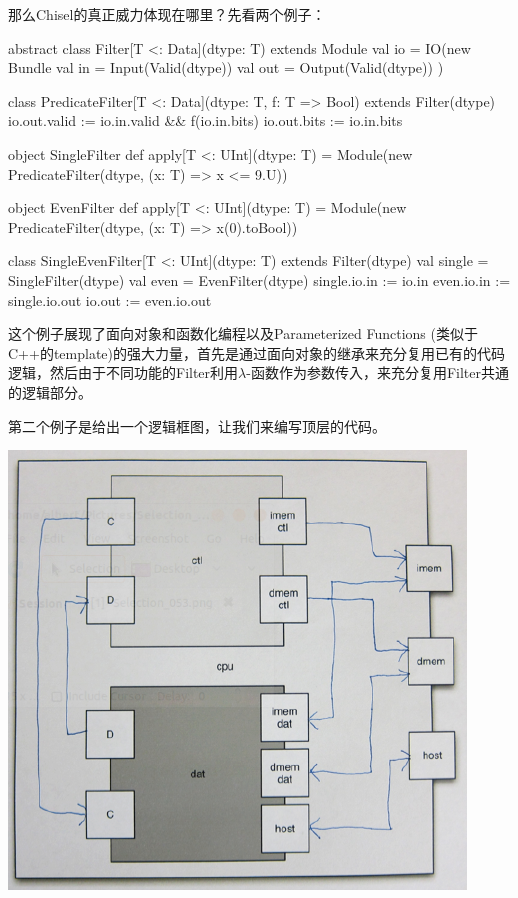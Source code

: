 \documentclass{article}
\begin{document}
	那么Chisel的真正威力体现在哪里？先看两个例子：
	\begin{multicols}{2}
	\begin{scala}
	abstract class Filter[T <: Data](dtype: T) extends Module {
		val io = IO(new Bundle {
			val in = Input(Valid(dtype))
			val out = Output(Valid(dtype))
		})
	}
	
	class PredicateFilter[T <: Data](dtype: T, f: T => Bool) extends Filter(dtype) {
		io.out.valid := io.in.valid && f(io.in.bits)
		io.out.bits  := io.in.bits
	}
	
	object SingleFilter {
		def apply[T <: UInt](dtype: T) = 
		Module(new PredicateFilter(dtype, (x: T) => x <= 9.U))
	}
	
	object EvenFilter {
		def apply[T <: UInt](dtype: T) = 
		Module(new PredicateFilter(dtype, (x: T) => x(0).toBool))
	}
	
	class SingleEvenFilter[T <: UInt](dtype: T) extends Filter(dtype) {
		val single = SingleFilter(dtype)
		val even   = EvenFilter(dtype)
		single.io.in  := io.in
		even.io.in    := single.io.out
		io.out        := even.io.out
	}
\end{scala}
这个例子展现了面向对象和函数化编程以及Parameterized Functions (类似于C++的template)的强大力量，首先是通过面向对象的继承来充分复用已有的代码逻辑，然后由于不同功能的Filter利用$\lambda$-函数作为参数传入，来充分复用Filter共通的逻辑部分。

第二个例子是给出一个逻辑框图，让我们来编写顶层的代码。~\cite{chisel}

\includegraphics[width=0.8\linewidth]{figs/Bulk.png}


\end{multicols}
\end{document}
